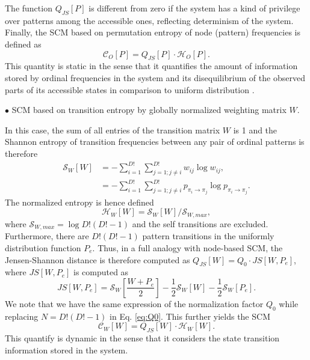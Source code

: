 \documentclass[12pt,aip,cha,reprint,nofootinbib]{revtex4-1}
\begin{document}
The function $Q_{JS}[P]$ is different from zero if the system has a kind of privilege over patterns among the accessible ones, reflecting determinism of the system. Finally, the SCM based on permutation entropy of node (pattern) frequencies is defined as 
\begin{equation}
\mathcal{C}_{O}[P] = Q_{JS}[P] \cdot \mathcal{H}_{O}[P].
\end{equation}
This quantity is static in the sense that it quantifies the amount of information stored by ordinal frequencies in the system and its disequilibrium of the observed parts of its accessible states in comparison to uniform distribution \cite{LopezPLA1995}. 

$\bullet$ SCM based on transition entropy by globally normalized weighting matrix $W$. 

In this case, the sum of all entries of the transition matrix $W$ is 1 and the Shannon entropy of transition frequencies between any pair of ordinal patterns is therefore 
\begin{equation}
\begin{split}
\mathcal{S}_{W}[W] &= - \sum_{i=1}^{D!} \sum_{j = 1; j \neq i}^{D!} w_{ij} \log w_{ij}, \\
& = - \sum_{i=1}^{D!} \sum_{j =1; j \neq i}^{D!} p_{\pi_i \to \pi_j} \log p_{\pi_i \to \pi_j}. 
\end{split}
\end{equation}
The normalized entropy is hence defined 
\begin{equation}
\mathcal{H}_{W}[W] = \mathcal{S}_{W}[W] / \mathcal{S}_{W, max}, 
\end{equation}
where $\mathcal{S}_{W, max} = \log D! (D! - 1)$ and the self transitions are excluded. Furthermore, there are $D! (D! - 1)$ pattern transitions in the uniformly distribution function $P_e$. Thus, in a full analogy with node-based SCM, the Jensen-Shannon distance is therefore computed as $Q_{JS}[W] = Q_0 \cdot JS[W, P_e]$, where $JS[W, P_e]$ is computed as 
\begin{equation}
JS [W, P_e] = \mathcal{S}_{W}[\frac{W + P_e}{2}] - \frac{1}{2}\mathcal{S}_{W}[W] - \frac{1}{2}\mathcal{S}_{W}[P_e]. 
\end{equation}
We note that we have the same expression of the normalization factor $Q_0$ while replacing $N = D! (D! - 1)$ in Eq. \eqref{eq:Q0}. This further yields the SCM 
\begin{equation}
\mathcal{C}_{W}[W] = Q_{JS}[W] \cdot \mathcal{H}_{W}[W].
\end{equation}
This quantify is dynamic in the sense that it considers the state transition information stored in the system. 
\end{document}
